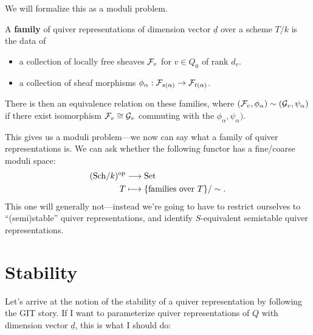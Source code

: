 \documentclass[12pt]{article}
\begin{document}
We will formalize this as a moduli problem.

\begin{problem}
    A \textbf{family} of quiver representations of dimension vector $\underline{d}$ over a scheme $T/k$ is the data of
    \begin{itemize}
        \item a collection of locally free sheaves $\mathcal{F}_v$ for $v\in Q_0$ of rank $d_v$.
        \item a collection of sheaf morphisms $\phi_\alpha: \cF_{s(\alpha)} \to \cF_{t(\alpha)}$.
    \end{itemize}

    There is then an equivalence relation on these families, where $(\cF_v,\phi_\alpha)\sim (\cG_v, \psi_\alpha)$ if there exist isomorphism $\mathcal{F}_v \cong \mathcal{G}_v$ commuting with the $\phi_\alpha,\psi_\alpha)$.

    This gives us a moduli problem---we now can say what a family of quiver representations is. We can ask whether the following functor has a fine/coarse moduli space:
    \begin{align*}
        (\mathrm{Sch}/k)^{\mathrm{op}} &\longrightarrow \mathrm{Set}\\
        T &\longmapsto \{\text{families over $T$}\}/\sim.
    \end{align*}
    This one will generally not---instead we're going to have to restrict ourselves to ``(semi)stable'' quiver representations, and identify $S$-equivalent semistable quiver representations.
\end{problem}


\section{Stability}

Let's arrive at the notion of the stability of a quiver representation by following the GIT story. If I want to parameterize quiver representations of $Q$ with dimension vector $\underline{d}$, this is what I should do:
\end{document}
